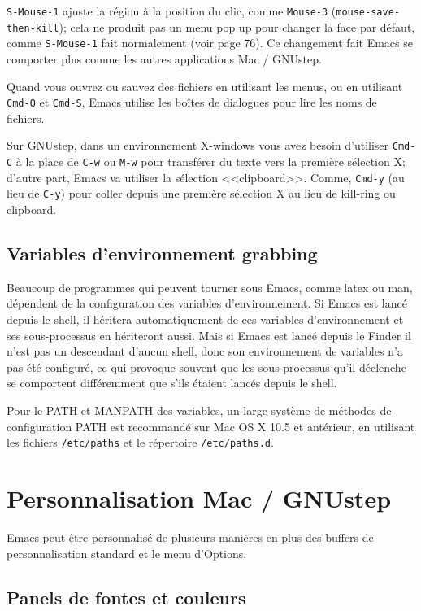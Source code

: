 \texttt{S-Mouse-1} ajuste la région à la position du clic, comme
\texttt{Mouse-3} (\texttt{mouse-save-then-kill}); cela ne produit pas
un menu pop up pour changer la face par défaut, comme
\texttt{S-Mouse-1} fait normalement (voir page 76). Ce changement fait
Emacs se comporter plus comme les autres applications Mac / GNUstep.

Quand vous ouvrez ou sauvez des fichiers en utilisant les menus, ou en
utilisant \texttt{Cmd-O} et \texttt{Cmd-S}, Emacs utilise les boîtes
de dialogues pour lire les noms de fichiers.

Sur GNUstep, dans un environnement X-windows vous avez besoin
d'utiliser \texttt{Cmd-C} à la place de \texttt{C-w} ou \texttt{M-w}
pour transférer du texte vers la première sélection X; d'autre part,
Emacs va utiliser la sélection <<clipboard>>. Comme,  \texttt{Cmd-y}
(au lieu de  \texttt{C-y}) pour coller depuis une première sélection X
au lieu de kill-ring ou clipboard.

 
\subsection{Variables d'environnement grabbing}\label{appFsec1subsec1}

Beaucoup de programmes qui peuvent tourner sous Emacs, comme latex ou
man, dépendent de la configuration des variables d'environnement. Si
Emacs est lancé depuis le shell, il héritera automatiquement de ces
variables d'environnement et ses sous-processus en hériteront
aussi. Mais si Emacs est lancé depuis le Finder il n'est pas un
descendant d'aucun shell, donc son environnement de variables n'a pas
été configuré, ce qui provoque souvent que les sous-processus qu'il
déclenche se comportent différemment que s'ils étaient lancés depuis
le shell.

Pour le PATH et MANPATH des variables, un large système de méthodes de
configuration PATH est recommandé sur Mac OS X 10.5 et antérieur, en
utilisant les fichiers \texttt{/etc/paths} et le répertoire
\texttt{/etc/paths.d}. 


\section{Personnalisation Mac / GNUstep}\label{appFsec2}

Emacs peut être personnalisé de plusieurs manières en plus des buffers
de personnalisation standard et le menu d'Options. 

\subsection{Panels de fontes et couleurs}\label{appFsec2subsec1}

